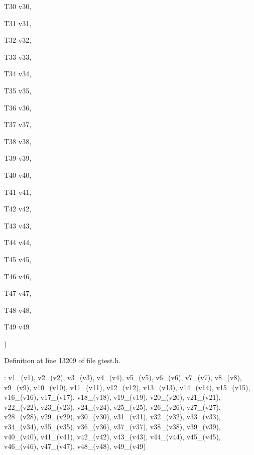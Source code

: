 {{\begin{DoxyParamCaption}
\item[{\-T30}]{v30, }
\item[{\-T31}]{v31, }
\item[{\-T32}]{v32, }
\item[{\-T33}]{v33, }
\item[{\-T34}]{v34, }
\item[{\-T35}]{v35, }
\item[{\-T36}]{v36, }
\item[{\-T37}]{v37, }
\item[{\-T38}]{v38, }
\item[{\-T39}]{v39, }
\item[{\-T40}]{v40, }
\item[{\-T41}]{v41, }
\item[{\-T42}]{v42, }
\item[{\-T43}]{v43, }
\item[{\-T44}]{v44, }
\item[{\-T45}]{v45, }
\item[{\-T46}]{v46, }
\item[{\-T47}]{v47, }
\item[{\-T48}]{v48, }
\item[{\-T49}]{v49}
\end{DoxyParamCaption}
)}}\label{dc/dd7/classtesting_1_1internal_1_1ValueArray49_a9d7021e3bf39c25dc838f6b9f0b7c36f}


\-Definition at line 13209 of file gtest.\-h.


\begin{DoxyCode}
               : v1_(v1), v2_(v2), v3_(v3), v4_(v4), v5_(v5), v6_(v6), v7_(v7),
      v8_(v8), v9_(v9), v10_(v10), v11_(v11), v12_(v12), v13_(v13), v14_(v14),
      v15_(v15), v16_(v16), v17_(v17), v18_(v18), v19_(v19), v20_(v20),
      v21_(v21), v22_(v22), v23_(v23), v24_(v24), v25_(v25), v26_(v26),
      v27_(v27), v28_(v28), v29_(v29), v30_(v30), v31_(v31), v32_(v32),
      v33_(v33), v34_(v34), v35_(v35), v36_(v36), v37_(v37), v38_(v38),
      v39_(v39), v40_(v40), v41_(v41), v42_(v42), v43_(v43), v44_(v44),
      v45_(v45), v46_(v46), v47_(v47), v48_(v48), v49_(v49) {}
\end{DoxyCode}


